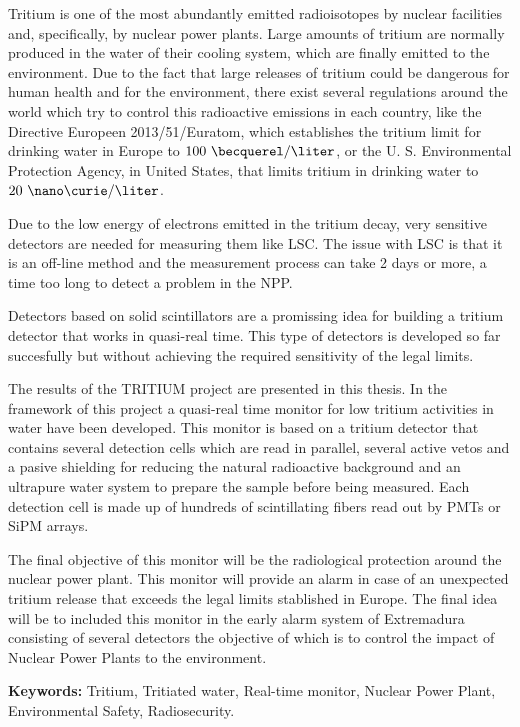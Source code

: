 Tritium is one of the most abundantly emitted radioisotopes by nuclear facilities and, specifically, by nuclear power plants. Large amounts of tritium are normally produced in the water of their cooling system, which are finally emitted to the environment. Due to the fact that large releases of tritium could be dangerous for human health and for the environment, there exist several regulations around the world which try to control this radioactive emissions in each country, like the Directive Europeen 2013/51/Euratom, which establishes the tritium limit for drinking water in Europe to $100~\becquerel/\liter$, or the U. S. Environmental Protection Agency, in United States, that limits tritium in drinking water to $20~\nano\curie/\liter$.

Due to the low energy of electrons emitted in the tritium decay, very sensitive detectors are needed for measuring them like LSC. The issue with LSC is that it is an off-line method and the measurement process can take 2 days or more, a time too long to detect a problem in the NPP.

Detectors based on solid scintillators are a promissing idea for building a tritium detector that works in quasi-real time. This type of detectors is developed so far succesfully but without achieving the required sensitivity of the legal limits.

The results of the TRITIUM project are presented in this thesis. In the framework of this project a quasi-real time monitor for low tritium activities in water have been developed. This monitor is based on a tritium detector that contains several detection cells which are read in parallel, several active vetos and a pasive shielding for reducing the natural radioactive background and an ultrapure water system to prepare the sample before being measured. Each detection cell is made up of hundreds of scintillating fibers read out by PMTs or SiPM arrays.

The final objective of this monitor will be the radiological protection around the nuclear power plant. This monitor will provide an alarm in case of an unexpected tritium release that exceeds the legal limits stablished in Europe. The final idea will be to included this monitor in the early alarm system of Extremadura consisting of several detectors the objective of which is to control the impact of Nuclear Power Plants to the environment.

\vspace{1cm}

\textbf{Keywords:} Tritium, Tritiated water, Real-time monitor, Nuclear Power Plant, Environmental Safety, Radiosecurity.
